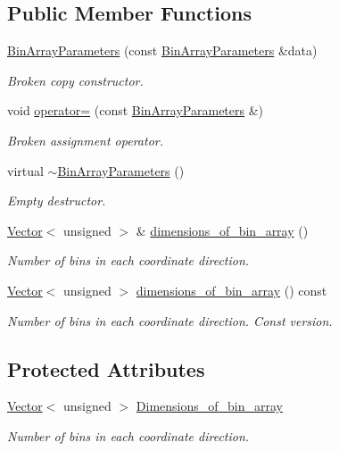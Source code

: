 \subsection*{Public Member Functions}
\begin{DoxyCompactItemize}
\item 
\hyperlink{classoomph_1_1BinArrayParameters_a5a1bf38b22afec8348b47d3ccbc9c2a9}{Bin\+Array\+Parameters} (const \hyperlink{classoomph_1_1BinArrayParameters}{Bin\+Array\+Parameters} \&data)
\begin{DoxyCompactList}\small\item\em Broken copy constructor. \end{DoxyCompactList}\item 
void \hyperlink{classoomph_1_1BinArrayParameters_a75c95b9419516e5ca6328a9f03432467}{operator=} (const \hyperlink{classoomph_1_1BinArrayParameters}{Bin\+Array\+Parameters} \&)
\begin{DoxyCompactList}\small\item\em Broken assignment operator. \end{DoxyCompactList}\item 
virtual \hyperlink{classoomph_1_1BinArrayParameters_a55a4fb68a273000d3782364ccac09c3f}{$\sim$\+Bin\+Array\+Parameters} ()
\begin{DoxyCompactList}\small\item\em Empty destructor. \end{DoxyCompactList}\item 
\hyperlink{classoomph_1_1Vector}{Vector}$<$ unsigned $>$ \& \hyperlink{classoomph_1_1BinArrayParameters_aafb1b653260c401db87ed75c51d06de8}{dimensions\+\_\+of\+\_\+bin\+\_\+array} ()
\begin{DoxyCompactList}\small\item\em Number of bins in each coordinate direction. \end{DoxyCompactList}\item 
\hyperlink{classoomph_1_1Vector}{Vector}$<$ unsigned $>$ \hyperlink{classoomph_1_1BinArrayParameters_a9f14007784881e7da72d48d80dcaebc9}{dimensions\+\_\+of\+\_\+bin\+\_\+array} () const
\begin{DoxyCompactList}\small\item\em Number of bins in each coordinate direction. Const version. \end{DoxyCompactList}\end{DoxyCompactItemize}
\subsection*{Protected Attributes}
\begin{DoxyCompactItemize}
\item 
\hyperlink{classoomph_1_1Vector}{Vector}$<$ unsigned $>$ \hyperlink{classoomph_1_1BinArrayParameters_af3dfb49b2d50911c4b8b2f063ffa8de9}{Dimensions\+\_\+of\+\_\+bin\+\_\+array}
\begin{DoxyCompactList}\small\item\em Number of bins in each coordinate direction. \end{DoxyCompactList}\end{DoxyCompactItemize}
